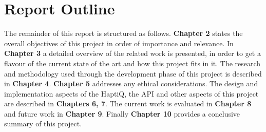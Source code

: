 \section{Report Outline}
The remainder of this report is structured as follows. \textbf{Chapter 2} states the overall objectives of this project in order of importance and relevance. In \textbf{Chapter 3} a detailed overview of the related work is presented, in order to get a flavour of the current state of the art and how this project fits in it. The research and methodology used through the development phase of this project is described in \textbf{Chapter 4}. \textbf{Chapter 5} addresses any ethical considerations. The design and implementation aspects of the HaptiQ, the API and other aspects of this project are described in \textbf{Chapters 6, 7}. The current work is evaluated in \textbf{Chapter 8}  and future work in \textbf{Chapter 9}. Finally \textbf{Chapter 10} provides a conclusive summary of this project.
